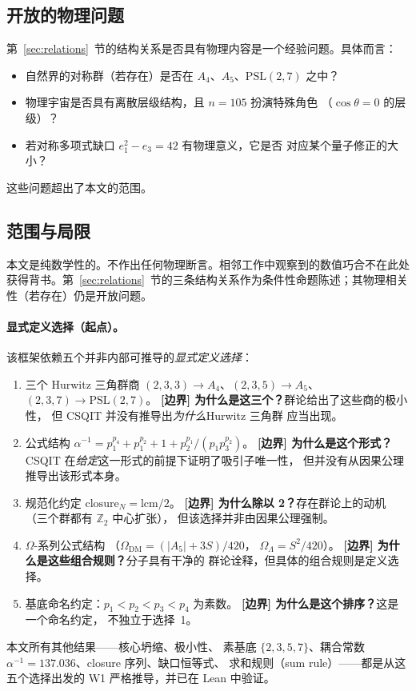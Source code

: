 \documentclass[11pt]{ctexart}
\newcommand{\bc}[1]{\textcolor{bcolor}{\textbf{[边界] #1}}}
\begin{document}
\subsection{开放的物理问题}
第~\ref{sec:relations}~节的结构关系是否具有物理内容是一个经验问题。具体而言：
\begin{itemize}
\item 自然界的对称群（若存在）是否在
  $A_4$、$A_5$、$\mathrm{PSL}(2,7)$ 之中？
\item 物理宇宙是否具有离散层级结构，且 $n = 105$ 扮演特殊角色
  （$\cos\theta = 0$ 的层级）？
\item 若对称多项式缺口
  $e_1^2 - e_3 = 42$ 有物理意义，它是否
  对应某个量子修正的大小？
\end{itemize}
这些问题超出了本文的范围。

\subsection{范围与局限}
本文是纯数学性的。不作出任何物理断言。相邻工作中观察到的数值巧合不在此处获得背书。第~\ref{sec:relations}~节的三条结构关系作为条件性命题陈述；其物理相关性（若存在）仍是开放问题。

\paragraph{显式定义选择（起点）。}
该框架依赖五个并非内部可推导的\emph{显式定义选择}：
\begin{enumerate}
\item 三个 Hurwitz 三角群商
  $(2,3,3) \to A_4$、$(2,3,5) \to A_5$、
  $(2,3,7) \to \mathrm{PSL}(2,7)$。
  \bc{为什么是这三个？}群论给出了这些商的极小性，
  但 CSQIT 并没有推导出\emph{为什么}Hurwitz 三角群
  应当出现。
\item 公式结构
  $\alpha^{-1} = p_1^{p_4} + p_1^{p_2} + 1 + p_2^{p_1}/(p_1 p_3^{p_2})$。
  \bc{为什么是这个形式？}CSQIT 在\emph{给定}这一形式的前提下证明了吸引子唯一性，
  但并没有从因果公理推导出该形式本身。
\item 规范化约定
  $\mathrm{closure}_N = \mathrm{lcm}/2$。
  \bc{为什么除以 2？}存在群论上的动机
  （三个群都有 $\mathbb{Z}_2$ 中心扩张），
  但该选择并非由因果公理强制。
\item $\Omega$-系列公式结构
  （$\Omega_{\mathrm{DM}} = (|A_5| + 3S)/420$，
  $\Omega_\Lambda = S^2/420$）。
  \bc{为什么是这些组合规则？}分子具有干净的
  群论诠释，但具体的组合规则是定义选择。
\item 基底命名约定：$p_1 < p_2 < p_3 < p_4$
  为素数。
  \bc{为什么是这个排序？}这是一个命名约定，
  不独立于选择~1。
\end{enumerate}
本文所有其他结果——核心坍缩、极小性、
素基底 $\{2,3,5,7\}$、耦合常数
$\alpha^{-1} = 137.036$、closure 序列、缺口恒等式、
求和规则（sum rule）——都是从这五个选择出发的 W1 严格推导，并已在 Lean 中验证。
\end{document}
